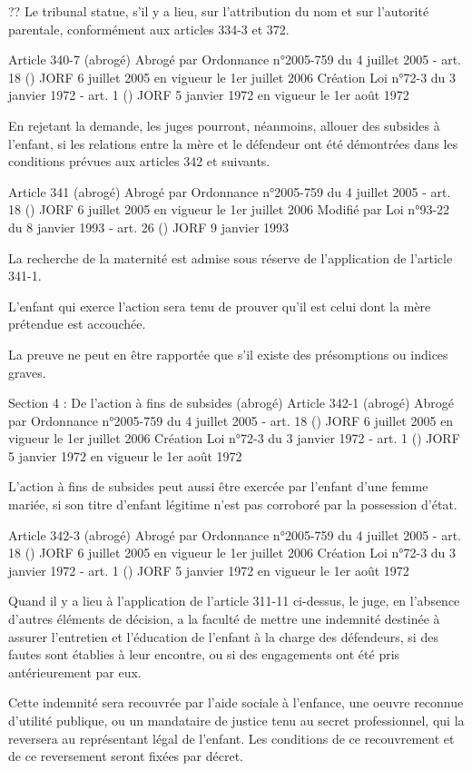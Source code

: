 \documentclass[
  12pt,
]{book}
\begin{document}
\begin{encadre}{??}
Le tribunal statue, s'il y a lieu, sur l'attribution du nom et sur l'autorité parentale, conformément aux articles 334-3 et 372.

Article 340-7 (abrogé)
Abrogé par Ordonnance n°2005-759 du 4 juillet 2005 - art. 18 () JORF 6 juillet 2005 en vigueur le 1er juillet 2006
Création Loi n°72-3 du 3 janvier 1972 - art. 1 () JORF 5 janvier 1972 en vigueur le 1er août 1972

En rejetant la demande, les juges pourront, néanmoins, allouer des subsides à l'enfant, si les relations entre la mère et le défendeur ont été démontrées dans les conditions prévues aux articles 342 et suivants.

Article 341 (abrogé)
Abrogé par Ordonnance n°2005-759 du 4 juillet 2005 - art. 18 () JORF 6 juillet 2005 en vigueur le 1er juillet 2006
Modifié par Loi n°93-22 du 8 janvier 1993 - art. 26 () JORF 9 janvier 1993

La recherche de la maternité est admise sous réserve de l'application de l'article 341-1.

L'enfant qui exerce l'action sera tenu de prouver qu'il est celui dont la mère prétendue est accouchée.

La preuve ne peut en être rapportée que s'il existe des présomptions ou indices graves.

Section 4 : De l'action à fins de subsides (abrogé)
Article 342-1 (abrogé)
Abrogé par Ordonnance n°2005-759 du 4 juillet 2005 - art. 18 () JORF 6 juillet 2005 en vigueur le 1er juillet 2006
Création Loi n°72-3 du 3 janvier 1972 - art. 1 () JORF 5 janvier 1972 en vigueur le 1er août 1972

L'action à fins de subsides peut aussi être exercée par l'enfant d'une femme mariée, si son titre d'enfant légitime n'est pas corroboré par la possession d'état.

Article 342-3 (abrogé)
Abrogé par Ordonnance n°2005-759 du 4 juillet 2005 - art. 18 () JORF 6 juillet 2005 en vigueur le 1er juillet 2006
Création Loi n°72-3 du 3 janvier 1972 - art. 1 () JORF 5 janvier 1972 en vigueur le 1er août 1972

Quand il y a lieu à l'application de l'article 311-11 ci-dessus, le juge, en l'absence d'autres éléments de décision, a la faculté de mettre une indemnité destinée à assurer l'entretien et l'éducation de l'enfant à la charge des défendeurs, si des fautes sont établies à leur encontre, ou si des engagements ont été pris antérieurement par eux.

Cette indemnité sera recouvrée par l'aide sociale à l'enfance, une oeuvre reconnue d'utilité publique, ou un mandataire de justice tenu au secret professionnel, qui la reversera au représentant légal de l'enfant. Les conditions de ce recouvrement et de ce reversement seront fixées par décret.


\end{encadre}
\end{document}
